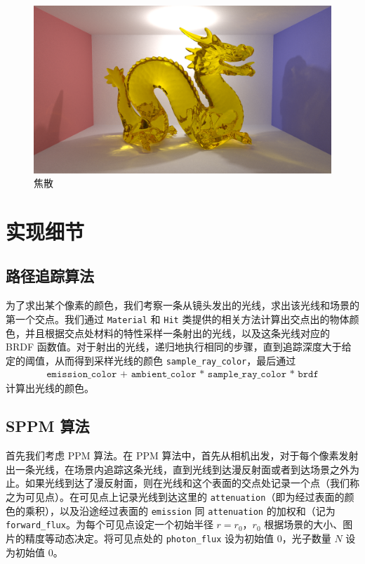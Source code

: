 \documentclass[cn]{report}
\let\t\texttt
\begin{document}
    \begin{figure}[htbp]
        \centering
        \includegraphics[width=\linewidth]{../results/caustics.png}
        \caption{焦散}
        \label{fig:caustics}
    \end{figure}
    \fi

    \FloatBarrier

    \section{实现细节}

    \subsection{路径追踪算法}
    为了求出某个像素的颜色，我们考察一条从镜头发出的光线，求出该光线和场景的第一个交点。我们通过 \t{Material} 和 \t{Hit} 类提供的相关方法计算出交点出的物体颜色，并且根据交点处材料的特性采样一条射出的光线，以及这条光线对应的 BRDF 函数值。对于射出的光线，递归地执行相同的步骤，直到追踪深度大于给定的阈值，从而得到采样光线的颜色 \t{sample\_ray\_color}，最后通过 \begin{align}\t{emission\_color + ambient\_color * sample\_ray\_color * brdf} \end{align} 计算出光线的颜色。

    \subsection{SPPM 算法}

    首先我们考虑 PPM 算法。在 PPM 算法中，首先从相机出发，对于每个像素发射出一条光线，在场景内追踪这条光线，直到光线到达漫反射面或者到达场景之外为止。如果光线到达了漫反射面，则在光线和这个表面的交点处记录一个点（我们称之为可见点）。在可见点上记录光线到达这里的 \t{attenuation}（即为经过表面的颜色的乘积），以及沿途经过表面的 \t{emission} 同 \t{attenuation} 的加权和（记为 \t{forward\_flux}。为每个可见点设定一个初始半径 $r = r_0$，$r_0$ 根据场景的大小、图片的精度等动态决定。将可见点处的 \t{photon\_flux} 设为初始值 0，光子数量 $N$ 设为初始值 0。
\end{document}
